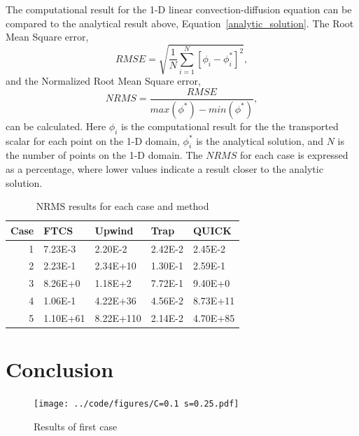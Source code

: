 \documentclass[twocolumn,10pt]{asme2ej}
\begin{document}
The computational result for the 1-D linear convection-diffusion equation can be compared to the analytical result above, Equation~\ref{analytic_solution}. The Root Mean Square error,
\begin{equation}
RMSE = \sqrt{\frac{1}{N}\sum\limits_{i=1}^N[\phi_i - \phi^*_i]^2},
\end{equation}
and the Normalized Root Mean Square error,
\begin{equation}
NRMS = \dfrac{RMSE}{max(\phi^*)-min(\phi^*)},
\end{equation}
can be calculated. Here $\phi_i$ is the computational result for the the transported scalar for each point on the 1-D domain, $\phi^*_i$ is the analytical solution, and $N$ is the number of points on the 1-D domain. The $NRMS$ for each case is expressed as a percentage, where lower values indicate a result closer to the analytic solution.

\begin{table}[htb]
\begin{center}
\begin{tabular}{|r | l l l l|}
\hline
Case & FTCS & Upwind & Trap & QUICK  \\
\hline
1 & 7.23E-3  & 2.20E-2   & 2.42E-2 & 2.45E-2  \\
2 & 2.23E-1  & 2.34E+10  & 1.30E-1 & 2.59E-1  \\
3 & 8.26E+0  & 1.18E+2   & 7.72E-1 & 9.40E+0  \\
4 & 1.06E-1  & 4.22E+36  & 4.56E-2 & 8.73E+11 \\
5 & 1.10E+61 & 8.22E+110 & 2.14E-2 & 4.70E+85 \\
\hline
\end{tabular}
\caption{NRMS results for each case and method}
\label{rms_table}
\end{center}
\end{table}

\section{Conclusion}

\nocite{*}



\begin{figure}[thb]
\begin{center}
\texttt{[image: ../code/figures/C=0.1 s=0.25.pdf]}
\caption{Results of first case}
\label{case_1_results}
\end{center}
\end{figure}
\end{document}
